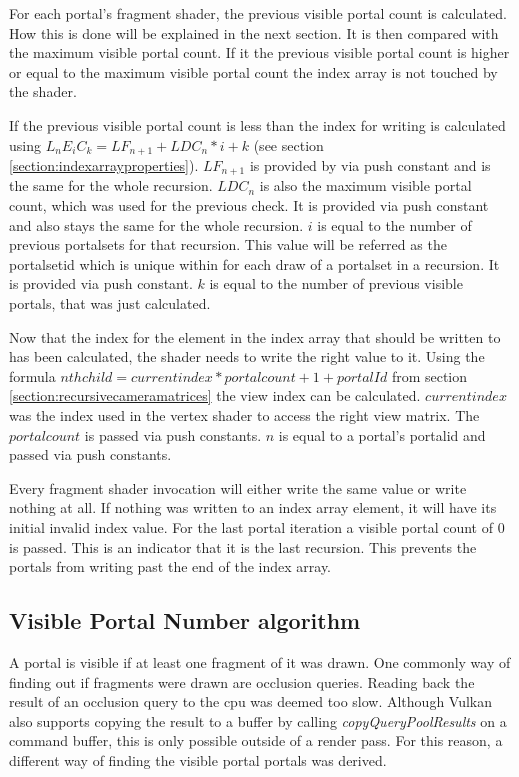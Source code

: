 For each portal's fragment shader, the previous visible portal count is calculated. How this is done will be explained in the next section. It is then compared with the maximum visible portal count. If it the previous visible portal count is higher or equal to the maximum visible portal count the index array is not touched by the shader.

If the previous visible portal count is less than the index for writing is calculated using $L_nE_iC_k = LF_{n+1} + LDC_{n} * i + k$ (see section \ref{section:indexarrayproperties}). $LF_{n+1}$ is provided by via push constant and is the same for the whole recursion. $LDC_{n}$ is also the maximum visible portal count, which was used for the previous check. It is provided via push constant and also stays the same for the whole recursion. $i$ is equal to the number of previous \glspl{portalset} for that recursion. This value will be referred as the \gls{portalsetid} which is unique within for each draw of a \gls{portalset} in a recursion. It is provided via push constant. $k$ is equal to the number of previous visible portals, that was just calculated.

Now that the index for the element in the index array that should be written to has been calculated, the shader needs to write the right value to it. Using the formula $ nth child = current index * portalcount + 1 + portalId$ from section \ref{section:recursivecameramatrices} the view index can be calculated. $currentindex$ was the index used in the vertex shader to access the right view matrix. The $portalcount$ is passed via push constants. $n$ is equal to a portal's \gls{portalid} and passed via push constants.

Every fragment shader invocation will either write the same value or write nothing at all. If nothing was written to an index array element, it will have its initial invalid index value. For the last portal iteration a visible portal count of 0 is passed. This is an indicator that it is the last recursion. This prevents the portals from writing past the end of the index array.

\subsection{Visible Portal Number algorithm}
\label{section:visibleportalcount}
A portal is visible if at least one fragment of it was drawn. One commonly way of finding out if fragments were drawn are occlusion queries. Reading back the result of an occlusion query to the \gls{cpu} was deemed too slow. Although Vulkan also supports copying the result to a buffer by calling \textit{copyQueryPoolResults} on a command buffer, this is only possible outside of a render pass. For this reason, a different way of finding the visible portal portals was derived.

